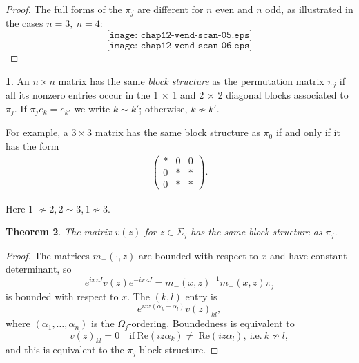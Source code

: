 \documentclass{surv-l}
\theoremstyle{plain}
\newtheorem{theorem}{Theorem}[section]
\theoremstyle{definition}
\newtheorem{definition}[theorem]{\sc{Definition}}
\numberwithin{equation}{chapter}
\begin{document}
\begin{proof}
The full forms of the $\pi_{j}$ are different for $n$ even and $n$ odd, as illustrated in the cases $n=3,\ n =4$:
\begin{equation*}
\tag{12.9}
\texttt{[image: chap12-vend-scan-05.eps]}
\end{equation*}
\begin{equation*}
\tag{12.10}
\texttt{[image: chap12-vend-scan-06.eps]}
\end{equation*}
\end{proof}
\setcounter{theorem}{10}
\begin{definition}\label{defi12.11}
An $n\times n$ matrix has the same \emph{block structure} as the permutation matrix $\pi_{j}$ if all its nonzero entries occur in the 1 $\times$ 1 and 2 $\times$ 2 diagonal blocks associated to $\pi_{j}$. If $\pi_{j}e_{k}=e_{k'}$ we write $k\sim k'$; otherwise, $k\nsim k'$.

For example, a $3\times 3$ matrix has the same block structure as $\pi_{0}$ if and only if it has the form
\begin{align*}
\left(\begin{array}{ccc}
 \ast & 0 & 0\\
 0 & \ast & \ast\\
 0 & \ast & \ast
\end{array}\right).
\end{align*}

Here 1 $\nsim 2, 2\sim 3, 1\nsim 3$.
\end{definition}

\begin{theorem}\label{thm12.12}
The matrix $v(z)$ for $z\in\Sigma_{j}$ has the same block structure as $\pi_{j}$.
\end{theorem}
\begin{proof}
The matrices $m_{\pm}(\cdot, z)$ are bounded with respect to $x$ and have constant determinant, so
\begin{equation*}
e^{ixzJ}v(z)e^{-ixzJ}=m_{-}(x, z)^{-1}m_{+}(x, z)\pi_{j}
\end{equation*}
is bounded with respect to $x$. The $(k, l)$ entry is
\begin{equation*}
e^{ixz(\alpha_{k}-\alpha_{l})}v(z)_{kl},
\end{equation*}
where $(\alpha_{1},\ldots, \alpha_{n})$ is the $\Omega_{j}$-ordering. Boundedness is equivalent to
\begin{equation*}
v(z)_{kl}=0\quad \mathrm{if}\ \mathrm{Re}(iz\alpha_{k})\neq\ \mathrm{Re}(iz\alpha_{l}),\ \mathrm{i.e.}\ k\nsim l,
\end{equation*}
and this is equivalent to the $\pi_{j}$ block structure.
\end{proof}
\end{document}
